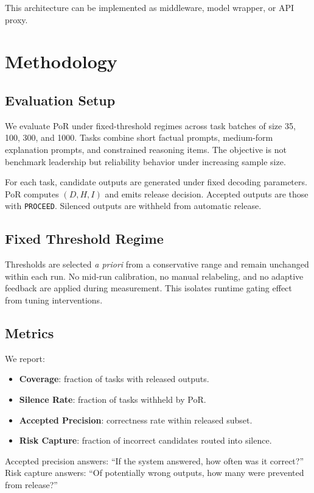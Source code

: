 \documentclass[11pt]{article}
\begin{document}
This architecture can be implemented as middleware, model wrapper, or API proxy.

\section{Methodology}
\subsection{Evaluation Setup}
We evaluate PoR under fixed-threshold regimes across task batches of size 35, 100, 300, and 1000. Tasks combine short factual prompts, medium-form explanation prompts, and constrained reasoning items. The objective is not benchmark leadership but reliability behavior under increasing sample size.

For each task, candidate outputs are generated under fixed decoding parameters. PoR computes $(D,H,I)$ and emits release decision. Accepted outputs are those with \texttt{PROCEED}. Silenced outputs are withheld from automatic release.

\subsection{Fixed Threshold Regime}
Thresholds are selected \emph{a priori} from a conservative range and remain unchanged within each run. No mid-run calibration, no manual relabeling, and no adaptive feedback are applied during measurement. This isolates runtime gating effect from tuning interventions.

\subsection{Metrics}
We report:
\begin{itemize}[leftmargin=1.5em]
    \item \textbf{Coverage}: fraction of tasks with released outputs.
    \item \textbf{Silence Rate}: fraction of tasks withheld by PoR.
    \item \textbf{Accepted Precision}: correctness rate within released subset.
    \item \textbf{Risk Capture}: fraction of incorrect candidates routed into silence.
\end{itemize}

Accepted precision answers: ``If the system answered, how often was it correct?'' Risk capture answers: ``Of potentially wrong outputs, how many were prevented from release?''
\end{document}
